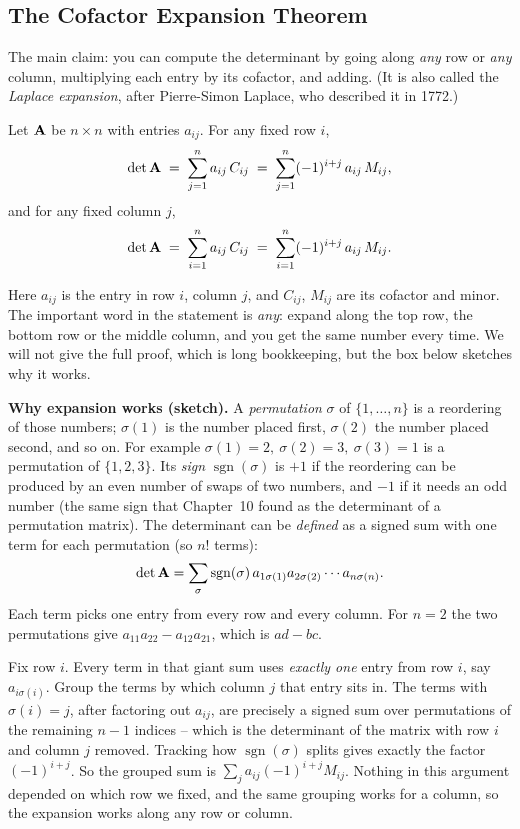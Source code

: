 \subsection{The Cofactor Expansion Theorem}

The main claim: you can compute the determinant by going along \emph{any} row or \emph{any}
column, multiplying each entry by its cofactor, and adding. (It is also called the \emph{Laplace
expansion}, after Pierre-Simon Laplace, who described it in 1772.)

\begin{theorem}\label{ch22:thm-expansion}
Let $\mathbf{A}$ be $n\times n$ with entries $a_{ij}$. For any fixed row $i$,
\[
\det\mathbf{A} \;=\; \sum_{j=1}^{n} a_{ij}\,C_{ij}
\;=\; \sum_{j=1}^{n} (-1)^{i+j}\,a_{ij}\,M_{ij},
\]
and for any fixed column $j$,
\[
\det\mathbf{A} \;=\; \sum_{i=1}^{n} a_{ij}\,C_{ij}
\;=\; \sum_{i=1}^{n} (-1)^{i+j}\,a_{ij}\,M_{ij}.
\]
\end{theorem}

Here $a_{ij}$ is the entry in row $i$, column $j$, and $C_{ij}$, $M_{ij}$ are its cofactor and minor.
The important word in the statement is \emph{any}: expand along the top row, the bottom row or the
middle column, and you get the same number every time. We will not give the full proof, which is
long bookkeeping, but the box below sketches why it works.

\begin{formalbox}
\textbf{Why expansion works (sketch).} A \emph{permutation} $\sigma$ of $\{1,\dots,n\}$ is a
reordering of those numbers; $\sigma(1)$ is the number placed first, $\sigma(2)$ the number placed
second, and so on. For example $\sigma(1)=2,\ \sigma(2)=3,\ \sigma(3)=1$ is a permutation of
$\{1,2,3\}$. Its \emph{sign} $\operatorname{sgn}(\sigma)$ is $+1$ if the reordering can be produced
by an even number of swaps of two numbers, and $-1$ if it needs an odd number (the same sign that Chapter~10 found as the determinant of a permutation matrix). The determinant can be
\emph{defined} as a signed sum with one term for each permutation (so $n!$ terms):
\[
\det\mathbf{A}=\sum_{\sigma}\operatorname{sgn}(\sigma)\,a_{1\sigma(1)}a_{2\sigma(2)}\cdots a_{n\sigma(n)}.
\]
Each term picks one entry from every row and every column. For $n=2$ the two permutations give
$a_{11}a_{22}-a_{12}a_{21}$, which is $ad-bc$.

Fix row $i$. Every term in that giant sum uses \emph{exactly one} entry from row $i$, say
$a_{i\sigma(i)}$. Group the terms by which column $j$ that entry sits in. The terms with
$\sigma(i)=j$, after factoring out $a_{ij}$, are precisely a signed sum over permutations of the
remaining $n-1$ indices -- which is the determinant of the matrix with row $i$ and column $j$
removed. Tracking how $\operatorname{sgn}(\sigma)$ splits gives exactly the factor $(-1)^{i+j}$. So
the grouped sum is $\sum_j a_{ij}(-1)^{i+j}M_{ij}$. Nothing in this argument depended on which row
we fixed, and the same grouping works for a column, so the expansion works along any row or column.
\end{formalbox}

